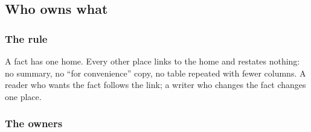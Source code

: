 \subsection{Who owns what}\label{sec:docs-proposal-owners}

\subsubsection{The rule}\label{sec:docs-own-rule}

A fact has one home. Every other place links to the home and restates nothing: no summary, no ``for convenience'' copy, no table repeated with fewer columns. A reader who wants the fact follows the link; a writer who changes the fact changes one place.

\subsubsection{The owners}\label{sec:docs-owners}

